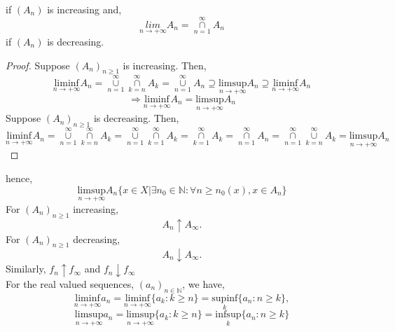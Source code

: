 \documentclass[letterpaper, 12pt]{article}
\newcommand{\1}{\mathds{1}}	%
\theoremstyle{definition}
\begin{document}
{
if $(A_n)$ is increasing and, 
\[{\underset{n \to + \infty}{lim}} A_{n} = \overset{\infty}{ \underset{n = 1}{\cap}} A_{n}\]
if $(A_n)$ is decreasing.
\begin{proof}
    Suppose $(A_n)_{n \geq 1}$ is increasing. Then, \[\underset{n \to +\infty}{\mathrm{lim inf}} A_n = \overset{\infty}{ \underset{n=1}{\cup}} \overset{\infty}{ \underset{k=n}{\cap}} A_{k} = \overset{\infty}{ \underset{n = 1}{\cup}} A_{n} \supseteq \underset{n \to +\infty}{\mathrm{lim sup}} A_n \supseteq \underset{n \to +\infty}{\mathrm{lim inf}} A_n\]
    \[\Longrightarrow \underset{n \to +\infty}{\mathrm{lim inf}} A_n = \underset{n \to +\infty}{\mathrm{lim sup}} A_n\]
    Suppose $(A_n)_{n \geq 1}$ is decreasing. Then, \[\underset{n \to +\infty}{\mathrm{lim inf}} A_n = \overset{\infty}{ \underset{n=1}{\cup}} \overset{\infty}{ \underset{k=n}{\cap}} A_{k} = \overset{\infty}{ \underset{n=1}{\cup}} \overset{\infty}{ \underset{k=1}{\cap}} A_{k} = \overset{\infty}{ \underset{k=1}{\cap}} A_{k} = \overset{\infty}{ \underset{n=1}{\cap}} A_{n}  = \overset{\infty}{ \underset{n=1}{\cap}} \overset{\infty}{ \underset{k=n}{\cup}} A_{k} = \underset{n \to +\infty}{\mathrm{lim sup}} A_n\]
\end{proof}

hence,
\[\underset{n \to +\infty}{\mathrm{lim sup}} A_n \{x \in X | \exists n_0 \in \mathbb{N}: \forall n \geq n_0(x), x \in A_n\}\]
For $(A_n)_{n \geq 1}$ increasing, \[A_n \uparrow A_{\infty}. \]
For $(A_n)_{n \geq 1}$ decreasing, \[A_n \downarrow A_{\infty}. \]
Similarly, 
$f_n \uparrow f_{\infty}$ and $f_n \downarrow f_{\infty}$ \\
For the real valued sequences, $(a_n)_{n \in \mathbb{N}}$, we have, 
\[\underset{n \to +\infty}{\mathrm{lim inf}} a_n = \underset{n \to +\infty}{\mathrm{lim inf}} \{a_k : k \geq n\} = \underset{k}{\mathrm{sup inf}} \{a_n : n \geq k\},\]
\[\underset{n \to +\infty}{\mathrm{lim sup}} a_n = \underset{n \to +\infty}{\mathrm{lim sup}} \{a_k : k \geq n\} = \underset{k}{\mathrm{inf sup}} \{a_n : n \geq k\}\]

}
\end{document}
